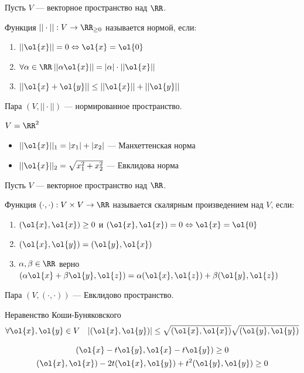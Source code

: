 \begin{defn}{}{}
    Пусть \( V \) --- векторное пространство над \( \RR \).

    Функция \( || \cdot || : V \to \RR_{\geq 0} \) называется нормой, если:
    \begin{enumerate}
        \item
            \( || \ol{x} || = 0 \Leftrightarrow \ol{x} = \ol{0} \)
        \item
            \( \forall \alpha \in \RR \: || \alpha \ol{x} || = | \alpha | \cdot || \ol{x} || \)
        \item
            \( || \ol{x} + \ol{y} || \leq || \ol{x} || + || \ol{y} || \)
    \end{enumerate}

    Пара \( (V, || \cdot ||) \) --- нормированное пространство.
\end{defn}

\begin{example}{}{}
    \( V = \RR^2 \)

    \begin{itemize}
        \item
            \( || \ol{x} ||_1 = |x_1| + |x_2| \) --- Манхеттенская норма
        \item
            \( || \ol{x} ||_2 = \sqrt{x_1^2 + x_2^2} \) --- Евклидова норма
    \end{itemize}
\end{example}

\begin{defn}{}{}
    Пусть \( V \) --- векторное пространство над \( \RR \).

    Функция \( (\cdot, \cdot) : V \times V \to \RR \) называется скалярным произведением над \( V \), если:
    \begin{enumerate}
        \item
            \( (\ol{x}, \ol{x}) \geq 0 \) и \( (\ol{x}, \ol{x}) = 0 \Leftrightarrow \ol{x} = \ol{0} \)
        \item
            \( (\ol{x}, \ol{y}) = (\ol{y}, \ol{x}) \)
        \item
            \( \alpha, \beta \in \RR \) верно
            \( (\alpha \ol{x} + \beta \ol{y}, \ol{z}) = \alpha (\ol{x}, \ol{z}) + \beta (\ol{y}, \ol{z}) \)
    \end{enumerate}

    Пара \( (V, (\cdot, \cdot)) \) --- Евклидово пространство.
\end{defn}

\begin{thrm}{Неравенство Коши-Буняковского}{}
    \[
        \forall \ol{x}, \ol{y} \in V \quad |(\ol{x}, \ol{y})| \leq \sqrt{(\ol{x}, \ol{x})} \sqrt{(\ol{y}, \ol{y})}
    \]
\end{thrm}
\begin{gather*}
    (\ol{x} - t \ol{y}, \ol{x} - t \ol{y}) \geq 0
    \\
    (\ol{x}, \ol{x}) - 2t (\ol{x}, \ol{y}) + t^2 (\ol{y}, \ol{y}) \geq 0
\end{gather*}


